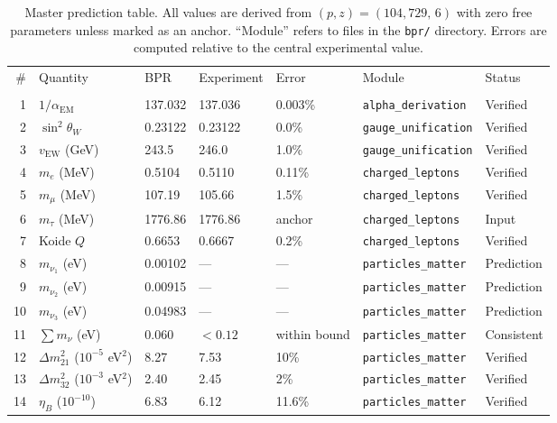 \documentclass[aps,prd,twocolumn,superscriptaddress,longbibliography,nofootinbib]{revtex4-2}
\newcommand{\vEW}{v_{\mathrm{EW}}}
\newcommand{\sinW}{\sin^2\!\theta_W}
\newcommand{\alphaEM}{\alpha_{\mathrm{EM}}}
\begin{document}
\begin{table}[t]
\caption{\label{tab:predictions}%
Master prediction table.  All values are derived from $(p, z) =
(104{,}729,\, 6)$ with zero free parameters unless marked as an
anchor.  ``Module'' refers to files in the \texttt{bpr/} directory.
Errors are computed relative to the central experimental value.}
\begin{ruledtabular}
\begin{tabular}{rllllll}
\textrm{\#} & \textrm{Quantity} & \textrm{BPR} &
\textrm{Experiment} & \textrm{Error} & \textrm{Module} &
\textrm{Status} \\
\colrule
\multicolumn{7}{c}{\textit{Particle Physics}} \\
1  & $1/\alphaEM$ & 137.032 & 137.036 & 0.003\% &
   \texttt{alpha\_derivation} & Verified \\
2  & $\sinW$ & 0.23122 & 0.23122 & 0.0\% &
   \texttt{gauge\_unification} & Verified \\
3  & $\vEW$ (GeV) & 243.5 & 246.0 & 1.0\% &
   \texttt{gauge\_unification} & Verified \\
4  & $m_e$ (MeV) & 0.5104 & 0.5110 & 0.11\% &
   \texttt{charged\_leptons} & Verified \\
5  & $m_\mu$ (MeV) & 107.19 & 105.66 & 1.5\% &
   \texttt{charged\_leptons} & Verified \\
6  & $m_\tau$ (MeV) & 1776.86 & 1776.86 & anchor &
   \texttt{charged\_leptons} & Input \\
7  & Koide $Q$ & 0.6653 & 0.6667 & 0.2\% &
   \texttt{charged\_leptons} & Verified \\
8  & $m_{\nu_1}$ (eV) & 0.00102 & --- & --- &
   \texttt{particles\_matter} & Prediction \\
9  & $m_{\nu_2}$ (eV) & 0.00915 & --- & --- &
   \texttt{particles\_matter} & Prediction \\
10 & $m_{\nu_3}$ (eV) & 0.04983 & --- & --- &
   \texttt{particles\_matter} & Prediction \\
11 & $\sum m_\nu$ (eV) & 0.060 & $<0.12$ & within bound &
   \texttt{particles\_matter} & Consistent \\
12 & $\Delta m^2_{21}$ ($10^{-5}$ eV$^2$) & 8.27 & 7.53 & 10\% &
   \texttt{particles\_matter} & Verified \\
13 & $\Delta m^2_{32}$ ($10^{-3}$ eV$^2$) & 2.40 & 2.45 & 2\% &
   \texttt{particles\_matter} & Verified \\
14 & $\eta_B$ ($10^{-10}$) & 6.83 & 6.12 & 11.6\% &
   \texttt{particles\_matter} & Verified \\

\end{tabular}
\end{ruledtabular}
\end{table}
\end{document}
